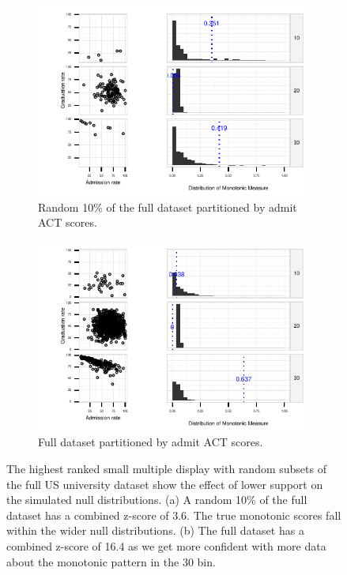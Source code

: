 \begin{figure}[t]
 \centering 
 	 \begin{subfigure}{3.5in}
 \centering 
		\includegraphics[width=3.5in]{images/3_62939129525163-ACT_Composite_75th_percentile_score_bin.pdf}
		  \caption{Random 10\% of the full dataset partitioned by admit ACT scores.}
		 \label{fig:support1}
 	\end{subfigure}
 	 \begin{subfigure}{3.5in}
 \centering 
        \vspace{0.25cm}
		\includegraphics[width=3.5in]{images/16_4166970016497-ACT_Composite_75th_percentile_score_bin.pdf}
		  \caption{Full dataset partitioned by admit ACT scores.}
		 \label{fig:support2}
 	\end{subfigure}
	\caption{The highest ranked small multiple display with random subsets of the full US university dataset show the effect of lower support on the simulated null distributions. (a) A random 10\% of the full dataset has a combined z-score of 3.6. The true monotonic scores fall within the wider null distributions. (b) The full dataset has a combined z-score of 16.4 as we get more confident with more data about the monotonic pattern in the $30$ bin.}
\end{figure}


